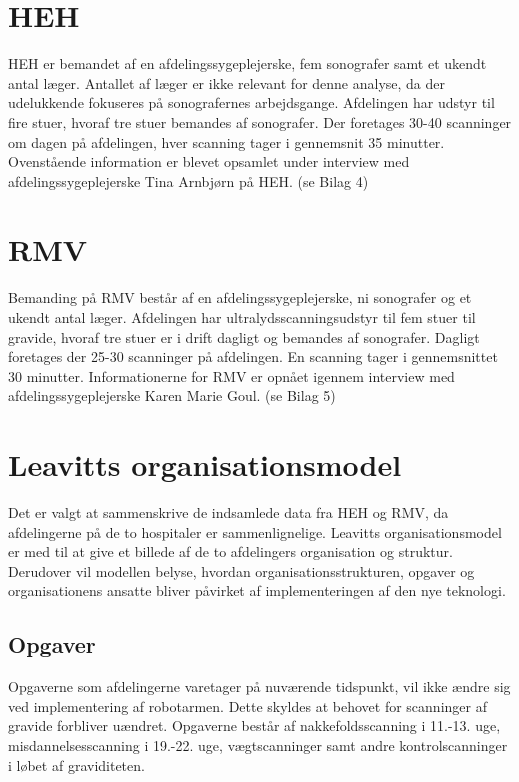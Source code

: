 \section{HEH}
HEH er bemandet af en afdelingssygeplejerske, fem sonografer samt et ukendt antal læger. Antallet af læger er ikke relevant for denne analyse, da der udelukkende fokuseres på sonografernes arbejdsgange.
Afdelingen har udstyr til fire stuer, hvoraf tre stuer bemandes af sonografer. Der foretages 30-40 scanninger om dagen på afdelingen, hver scanning tager i gennemsnit 35 minutter. 
Ovenstående information er blevet opsamlet under interview med afdelingssygeplejerske Tina Arnbjørn på HEH. (se Bilag 4)

\section{RMV}
Bemanding på RMV består af en afdelingssygeplejerske, ni sonografer og et ukendt antal læger. Afdelingen har ultralydsscanningsudstyr til fem stuer til gravide, hvoraf tre stuer er i drift dagligt og bemandes af sonografer. Dagligt foretages der 25-30 scanninger på afdelingen. En scanning tager i gennemsnittet 30 minutter.
Informationerne for RMV er opnået igennem interview med afdelingssygeplejerske Karen Marie Goul. (se Bilag 5)

\section{Leavitts organisationsmodel}
Det er valgt at sammenskrive de indsamlede data fra HEH og RMV, da afdelingerne på de to hospitaler er sammenlignelige. Leavitts organisationsmodel er med til at give et billede af de to afdelingers organisation og struktur. Derudover vil modellen belyse, hvordan organisationsstrukturen, opgaver og organisationens ansatte bliver påvirket af implementeringen af den nye teknologi. \cite{Leavitt} \cite{diamantmodel} 


\subsection{Opgaver}
Opgaverne som afdelingerne varetager på nuværende tidspunkt, vil ikke ændre sig ved implementering af robotarmen. Dette skyldes at behovet for scanninger af gravide forbliver uændret. Opgaverne består af nakkefoldsscanning i 11.-13. uge, misdannelsesscanning i 19.-22. uge, vægtscanninger samt andre kontrolscanninger i løbet af graviditeten. \cite{graviditet} 

